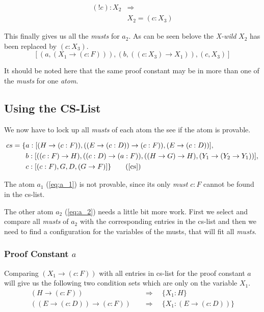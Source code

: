 \begin{equation*}
	\begin{split}
		(! c) : X_2 & \Rightarrow \\
		& X_2 = (c:X_3)
	\end{split}	
\end{equation*}

This finally gives us all the \emph{musts} for $a_2$. As can be seen belove the \emph{X-wild} $X_2$ has been replaced by $(c:X_3)$.
\begin{equation}\label{eq:a2_musts}
	[(a, (X_1 \rightarrow (c:F))), (b, ((c:X_3) \rightarrow X_1)), (c, X_3)]
\end{equation}

It should be noted here that the same proof constant may be in more than one of the \emph{musts} for one \emph{atom}. 

\subsection{Using the CS-List}
We now have to lock up all \emph{musts} of each atom the see if the atom is provable.

\begin{align*}
	cs = \{& a: [(H \rightarrow (c:F)), ((E \rightarrow (c:D)) \rightarrow (c:F)), (E \rightarrow (c:D))],\\
	& b: [((c:F) \rightarrow H), ((c:D) \rightarrow (a:F)), ((H \rightarrow G) \rightarrow H), (Y_1 \rightarrow (Y_2 \rightarrow Y_1))],\\
	& c: [(c:F), G, D, (G \rightarrow F)]\}
	\tag{\ref{cs}}
\end{align*}

The atom $a_1$ (\ref{eq:a_1}) is not provable, since its only \emph{must} $c:F$ cannot be found in the cs-list.

The other atom $a_2$ (\ref{eq:a_2}) needs a little bit more work. First we select and compare all \emph{musts} of $a_2$ with the corresponding entries in the cs-list and then we need to find a configuration for the variables of the musts, that will fit all \emph{musts}.

\subsubsection[look up proof constant a]{Proof Constant $a$}
Comparing $(X_1 \rightarrow (c:F))$ with all entries in cs-list for the proof constant $a$ will give us the following two condition sets which are only on the variable $X_1$.
\begin{align}
	(H \rightarrow (c:F)) & \quad \Rightarrow \quad \{X_1: H\} \\ 
	((E \rightarrow (c:D)) \rightarrow (c:F)) & \quad \Rightarrow  \quad \{X_1: (E \rightarrow (c:D))\} \label{condition:a}
\end{align}

